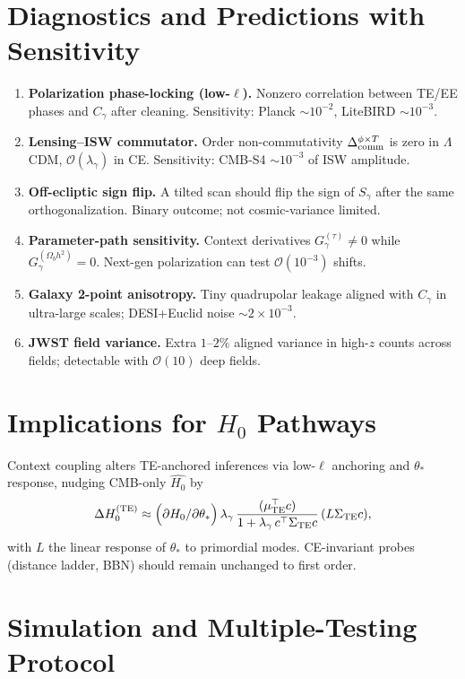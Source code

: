 \documentclass[11pt]{article}
\begin{document}
\section{Diagnostics and Predictions with Sensitivity}
\begin{enumerate}[label=\textbf{P\arabic*},leftmargin=*]
\item \textbf{Polarization phase-locking (low-$\ell$).} Nonzero correlation between TE/EE phases and $C_\gamma$ after cleaning. Sensitivity: Planck $\sim 10^{-2}$, LiteBIRD $\sim 10^{-3}$.
\item \textbf{Lensing--ISW commutator.} Order non-commutativity $\Delta_{\rm comm}^{\phi\times T}$ is zero in $\Lambda$CDM, $\mathcal O(\lambda_\gamma)$ in CE. Sensitivity: CMB-S4 $\sim 10^{-3}$ of ISW amplitude.
\item \textbf{Off-ecliptic sign flip.} A tilted scan should flip the sign of $S_\gamma$ after the same orthogonalization. Binary outcome; not cosmic-variance limited.
\item \textbf{Parameter-path sensitivity.} Context derivatives $G_\gamma^{(\tau)}\neq 0$ while $G_\gamma^{(\Omega_b h^2)}=0$. Next-gen polarization can test $\mathcal O(10^{-3})$ shifts.
\item \textbf{Galaxy 2-point anisotropy.} Tiny quadrupolar leakage aligned with $C_\gamma$ in ultra-large scales; DESI+Euclid noise $\sim 2\times 10^{-3}$.
\item \textbf{JWST field variance.} Extra $1$–$2\%$ aligned variance in high-$z$ counts across fields; detectable with $\mathcal O(10)$ deep fields.
\end{enumerate}

\section{Implications for $H_0$ Pathways}
Context coupling alters TE-anchored inferences via low-$\ell$ anchoring and $\theta_*$ response, nudging CMB-only $\widehat{H_0}$ by
\begin{equation}
\Delta H_0^{\rm (TE)}\approx \Big(\partial H_0/\partial \theta_*\Big)\,\lambda_\gamma\,\frac{(\mu_{\rm TE}^\top c)}{1+\lambda_\gamma\, c^\top \Sigma_{\rm TE} c}\, (L\Sigma_{\rm TE}c),
\end{equation}
with $L$ the linear response of $\theta_*$ to primordial modes. CE-invariant probes (distance ladder, BBN) should remain unchanged to first order.

\section{Simulation and Multiple-Testing Protocol}
\end{document}
